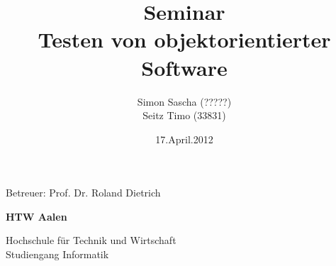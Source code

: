\documentclass[a4paper,12pt]{article}
\title{
\textbf{Seminar} \\
\vspace{20 mm}
Testen von objektorientierter Software \\
\vspace{20 mm}
}
\author{Simon Sascha (?????) \\
 Seitz Timo (33831)}
\date{17.April.2012}
\begin{document}
\maketitle
\vspace{10 mm}
\center Betreuer: Prof. Dr. Roland Dietrich \\
\vspace{50mm}

{\centering\bfseries
HTW Aalen
\par}

{\centering
Hochschule für Technik und Wirtschaft \\
Studiengang Informatik
\par}
\clearpage

\tableofcontents

\section{}
\end{document}
